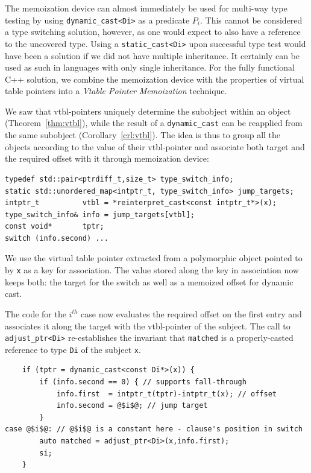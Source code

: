 \documentclass[preprint]{sigplanconf}
\makeatletter
\DeclareRobustCommand{\code}[1]{{\lstinline[breaklines=false,escapechar=@]{#1}}}
\makeatother
\begin{document}
The memoization device can almost immediately be used for multi-way type testing by 
using \code{dynamic_cast<Di>} as a predicate $P_i$. This cannot be considered a 
type switching solution, however, as one would expect to also have a reference 
to the uncovered type. Using a \code{static_cast<Di>} upon successful type test 
would have been a solution if we did not have multiple inheritance. It certainly 
can be used as such in languages with only single inheritance. For the fully 
functional C++ solution, we combine the memoization device with the properties 
of virtual table pointers into a \emph{Vtable Pointer Memoization} technique.

We saw that vtbl-pointers uniquely determine the subobject within an object 
(Theorem~\ref{thm:vtbl}), while the result of a \code{dynamic_cast} can be reapplied 
from the same subobject (Corollary~\ref{crl:vtbl}). The idea is thus to group 
all the objects according to the value of their vtbl-pointer and associate both 
target and the required offset with it through memoization device:

\begin{lstlisting}
typedef std::pair<ptrdiff_t,size_t> type_switch_info;
static std::unordered_map<intptr_t, type_switch_info> jump_targets;
intptr_t          vtbl = *reinterpret_cast<const intptr_t*>(x);
type_switch_info& info = jump_targets[vtbl];
const void*       tptr; 
switch (info.second) ...
\end{lstlisting}

\noindent
We use the virtual table pointer extracted from a polymorphic object pointed to 
by \code{x} as a key for association. The value stored along the key in 
association now keeps both: the target for the switch as well as a memoized 
offset for dynamic cast. 

The code for the $i^{th}$ case now evaluates the required offset on the first 
entry and associates it along the target with the vtbl-pointer of the subject.
The call to \code{adjust_ptr<Di>} re-establishes the invariant that 
\code{matched} is a properly-casted reference to type \code{Di} of the subject 
\code{x}.

\begin{lstlisting}
    if (tptr = dynamic_cast<const Di*>(x)) {
        if (info.second == 0) { // supports fall-through
            info.first  = intptr_t(tptr)-intptr_t(x); // offset
            info.second = @$i$@; // jump target
        }
case @$i$@: // @$i$@ is a constant here - clause's position in switch
        auto matched = adjust_ptr<Di>(x,info.first); 
        si;
    }
\end{lstlisting}
\end{document}
